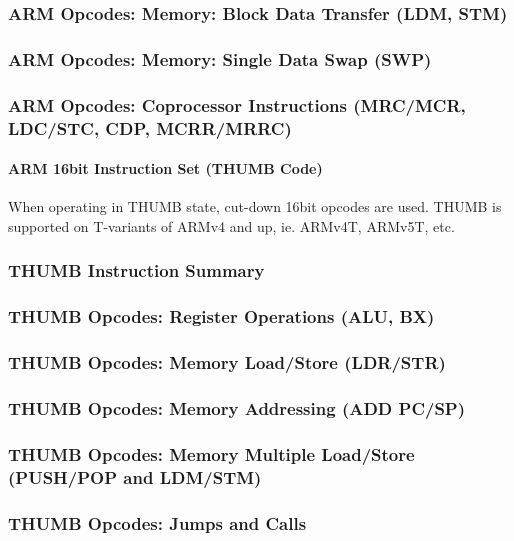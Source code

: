 \documentclass[11pt,a4paper]{proc}
\begin{document}
\begin{flushleft}
\subsubsection{ARM Opcodes: Memory: Block Data Transfer (LDM, STM)}

\subsubsection{ARM Opcodes: Memory: Single Data Swap (SWP)}

\subsubsection{ARM Opcodes: Coprocessor Instructions (MRC/MCR, LDC/STC, CDP, MCRR/MRRC)}

\paragraph{ARM 16bit Instruction Set (THUMB Code)}
When operating in THUMB state, cut-down 16bit opcodes are used.
THUMB is supported on T-variants of ARMv4 and up, ie. ARMv4T, ARMv5T, etc.

\subsubsection{THUMB Instruction Summary}

\subsubsection{THUMB Opcodes: Register Operations (ALU, BX)}

\subsubsection{THUMB Opcodes: Memory Load/Store (LDR/STR)}

\subsubsection{THUMB Opcodes: Memory Addressing (ADD PC/SP)}

\subsubsection{THUMB Opcodes: Memory Multiple Load/Store (PUSH/POP and LDM/STM)}

\subsubsection{THUMB Opcodes: Jumps and Calls}


\end{flushleft}
\end{document}
